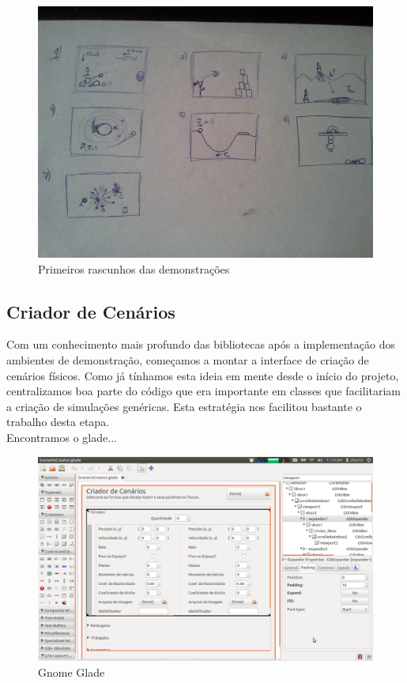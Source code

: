 \begin{figure}[H]
	\centering
	\includegraphics[scale=0.2]{images/tcc-demos.jpg}
	\caption{Primeiros rascunhos das demonstrações}
\end{figure}

\subsection{Criador de Cenários}
Com um conhecimento mais profundo das bibliotecas após a implementação dos ambientes de demonstração, começamos a montar a interface de criação de cenários físicos. Como já tínhamos esta ideia em mente desde o início do projeto, centralizamos boa parte do código que era importante em classes que facilitariam a criação de simulações genéricas. Esta estratégia nos facilitou bastante o trabalho desta etapa.\\

Encontramos o glade...

\begin{figure}[H]
	\centering
	\includegraphics[scale=0.3]{images/glade.png}
	\caption{Gnome Glade}
\end{figure}

